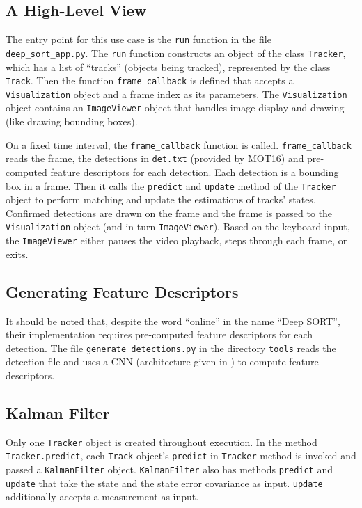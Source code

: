 \documentclass[conference]{IEEEtran}
\begin{document}
\subsection{A High-Level View}

The entry point for this use case is the \texttt{run} function in the file \texttt{deep\_sort\_app.py}. The \texttt{run} function constructs an object of the class \texttt{Tracker}, which has a list of ``tracks'' (objects being tracked), represented by the class \texttt{Track}. Then the function \texttt{frame\_callback} is defined that accepts a \texttt{Visualization} object and a frame index as its parameters. The \texttt{Visualization} object contains an \texttt{ImageViewer} object that handles image display and drawing (like drawing bounding boxes).

On a fixed time interval, the \texttt{frame\_callback} function is called. \texttt{frame\_callback} reads the frame, the detections in \texttt{det.txt} (provided by MOT16) and pre-computed feature descriptors for each detection. Each detection is a bounding box in a frame. Then it calls the \texttt{predict} and \texttt{update} method of the \texttt{Tracker} object to perform matching and update the estimations of tracks' states. Confirmed detections are drawn on the frame and the frame is passed to the \texttt{Visualization} object (and in turn \texttt{ImageViewer}). Based on the keyboard input, the \texttt{ImageViewer} either pauses the video playback, steps through each frame, or exits.

\subsection{Generating Feature Descriptors}

It should be noted that, despite the word ``online'' in the name ``Deep SORT'', their implementation requires pre-computed feature descriptors for each detection. The file \texttt{generate\_detections.py} in the directory \texttt{tools} reads the detection file and uses a CNN (architecture given in \cite{Wojke2018deep}) to compute feature descriptors.

\subsection{Kalman Filter}

Only one \texttt{Tracker} object is created throughout execution. In the method \texttt{Tracker.predict}, each \texttt{Track} object's \texttt{predict} in \texttt{Tracker} method is invoked and passed a \texttt{KalmanFilter} object. \texttt{KalmanFilter} also has methods \texttt{predict} and \texttt{update} that take the state and the state error covariance as input. \texttt{update} additionally accepts a measurement as input.
\end{document}
